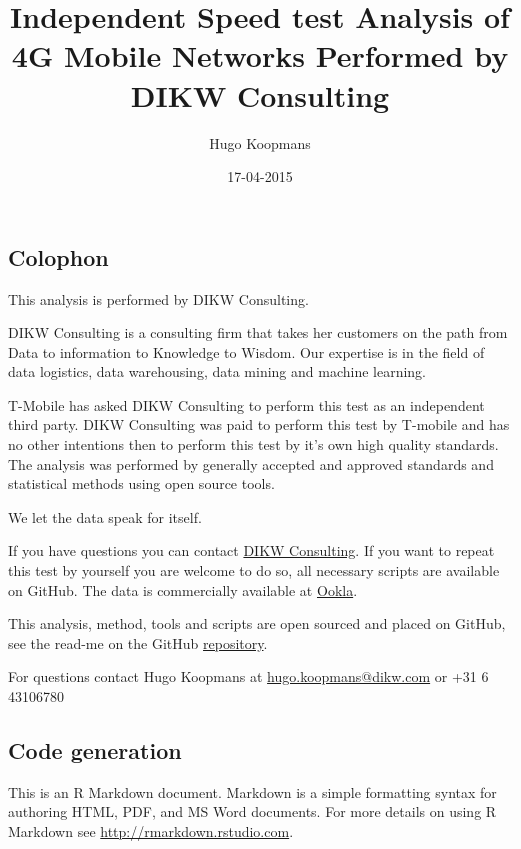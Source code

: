 \documentclass[]{article}
\title{Independent Speed test Analysis of 4G Mobile Networks Performed by DIKW
Consulting}
\author{Hugo Koopmans}
\date{17-04-2015}
\begin{document}
\maketitle

\newpage


{
\hypersetup{linkcolor=black}
\setcounter{tocdepth}{2}
\tableofcontents
}

\newpage

\newpage

\subsection{Colophon}\label{colophon}

This analysis is performed by DIKW Consulting.

DIKW Consulting is a consulting firm that takes her customers on the
path from Data to information to Knowledge to Wisdom. Our expertise is
in the field of data logistics, data warehousing, data mining and
machine learning.

T-Mobile has asked DIKW Consulting to perform this test as an
independent third party. DIKW Consulting was paid to perform this test
by T-mobile and has no other intentions then to perform this test by
it's own high quality standards. The analysis was performed by generally
accepted and approved standards and statistical methods using open
source tools.

We let the data speak for itself.

If you have questions you can contact \href{http://www.dikw.nl}{DIKW
Consulting}. If you want to repeat this test by yourself you are welcome
to do so, all necessary scripts are available on GitHub. The data is
commercially available at \href{http://www.ookla.com/}{Ookla}.

This analysis, method, tools and scripts are open sourced and placed on
GitHub, see the read-me on the GitHub
\href{https://github.com/hugokoopmans/ookla-speedtest-analysis}{repository}.

For questions contact Hugo Koopmans at
\href{mailto:hugo.koopmans@dikw.com}{hugo.koopmans@dikw.com} or +31 6
43106780

\subsection{Code generation}\label{code-generation}

This is an R Markdown document. Markdown is a simple formatting syntax
for authoring HTML, PDF, and MS Word documents. For more details on
using R Markdown see \url{http://rmarkdown.rstudio.com}.
\end{document}
